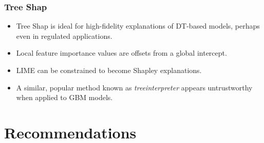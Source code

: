 \documentclass[11pt,
               aspectratio=169
               ]{beamer}
\begin{document}
		\begin{frame}
		
			\frametitle{Tree Shap}
			
			\begin{itemize}
				
				\item Tree Shap is ideal for high-fidelity explanations of DT-based models, perhaps even in regulated applications.
				
				\item Local feature importance values are offsets from a global intercept.
				
				\item LIME can be constrained to become Shapley explanations. 
				
				\item A similar, popular method known as \textit{treeinterpreter} appears untrustworthy when applied to GBM models. 
				
			\end{itemize}
			
		\end{frame}


	\section{Recommendations}
\end{document}
